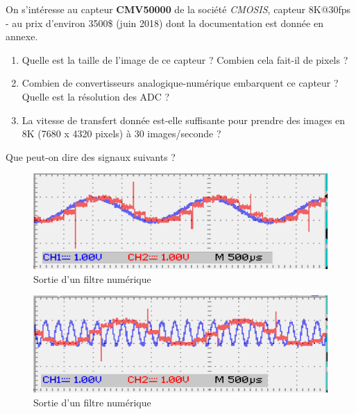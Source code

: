 On s'intéresse au capteur \textbf{CMV50000} de la société \textit{CMOSIS}, capteur 8K@30fps - au prix d'environ 3500\$ (juin 2018) dont la documentation est donnée en annexe.

\begin{enumerate}
	\item Quelle est la taille de l'image de ce capteur ? Combien cela fait-il de pixels ?
	\item Combien de convertisseurs analogique-numérique embarquent ce capteur ? Quelle est la résolution des ADC ?
	\item La vitesse de transfert donnée est-elle suffisante pour prendre des images en 8K (7680 x 4320 pixels) à 30 images/seconde ?
\end{enumerate}

\newpage

Que peut-on dire des signaux suivants ?

\begin{figure}[!h]
	\centering
	\includegraphics{images/TD/signal_num_1.png}
	\caption{Sortie d'un filtre numérique}
\end{figure}


\begin{figure}[!h]
	\centering
	\includegraphics{images/TD/signal_num_2.png}
	\caption{Sortie d'un filtre numérique}
\end{figure}

